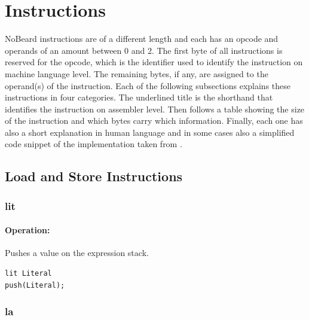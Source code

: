 \section{Instructions}\label{sec:instructions}
NoBeard instructions are of a different length and each has an opcode and operands of an amount between 0 and 2. The first byte of all instructions is reserved for the opcode, which is the identifier used to identify the instruction on machine language level. The remaining bytes, if any, are assigned to the operand(s) of the instruction.
Each of the following subsections explains these instructions in four categories. The underlined title is the shorthand that identifies the instruction on assembler level. Then follows a table showing the size of the instruction and which bytes carry which information. Finally, each one has also a short explanation in human language and in some cases also a simplified code snippet of the implementation taken from \cite{bauer_p._2017}.

\subsection{Load and Store Instructions}
\subsubsection{lit}

\paragraph{Operation:}
Pushes a value on the expression stack.

\begin{lstlisting}
lit Literal
push(Literal);
\end{lstlisting}


\subsubsection{la}

